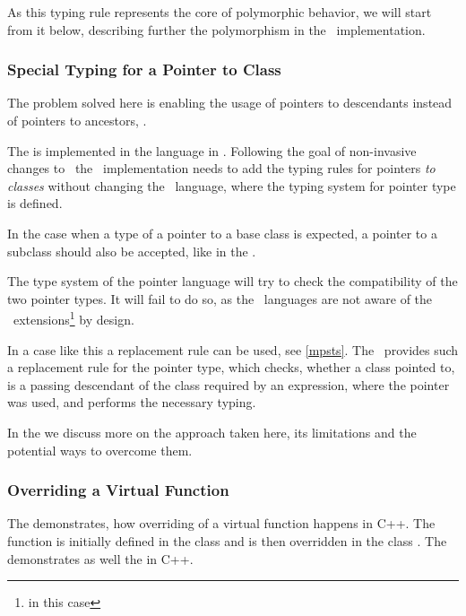 As this typing rule represents the core of polymorphic behavior, we will start from it below, describing further the
polymorphism in the \pcpp\ implementation.

\subsubsection{Special Typing for a Pointer to Class}
\label{pointertoclasstyping}

The problem solved here is enabling the usage of pointers to descendants instead of pointers to ancestors,
.


The   is implemented in the  language in \mbdr. 
Following the goal of non-invasive changes to \mbeddr\ the \pcpp\ implementation needs to add the 
typing rules for pointers \emph{to classes} without changing the    \mbdr\ language, where the 
typing system for pointer type is defined.

In the case when a type of a pointer to a base class is expected, a pointer to a subclass should also be accepted, like
in the .

The type system of the pointer language will try to check the compatibility of the two pointer types. It will
fail to do so, as the \mbdr\ languages are not aware of the \pcpp\ extensions\footnote{  in this case} 
by design.


In a case like this a replacement rule can be used, see \ref{mpsts}. The \pcpp\ provides such a replacement rule for the 
pointer type, which checks, whether a class pointed to, is a passing descendant of the class required by an expression, 
where the pointer was used, and performs the necessary typing.

In the  we discuss more on the approach taken here, its limitations and 
the potential ways to overcome them.

\subsubsection{Overriding a Virtual Function}
\label{overridefunction}

The  demonstrates, how overriding of a virtual function happens in C++.
The function  is initially defined in the class  and is then overridden
in the class . The  demonstrates as well the  in C++.

